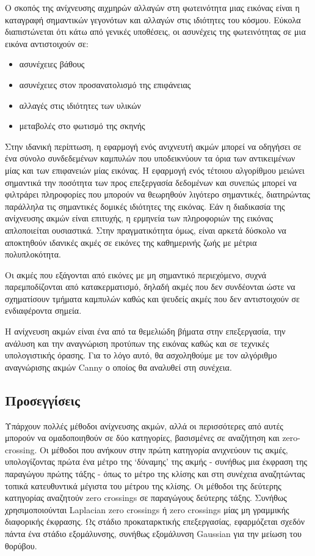 Ο σκοπός της ανίχνευσης αιχμηρών αλλαγών στη φωτεινότητα μιας εικόνας είναι η καταγραφή σημαντικών γεγονότων και αλλαγών στις ιδιότητες του κόσμου. Εύκολα διαπιστώνεται ότι κάτω από γενικές υποθέσεις, οι ασυνέχεις της φωτεινότητας σε μια εικόνα αντιστοιχούν σε:
\begin{itemize}
	\item ασυνέχειες βάθους
	\item ασυνέχειες στον προσανατολισμό της επιφάνειας
	\item αλλαγές στις ιδιότητες των υλικών
	\item μεταβολές στο φωτισμό της σκηνής \\
\end{itemize}
Στην ιδανική περίπτωση, η εφαρμογή ενός ανιχνευτή ακμών μπορεί να οδηγήσει σε ένα σύνολο συνδεδεμένων καμπυλών που υποδεικνύουν τα όρια των αντικειμένων μίας και των επιφανειών μίας εικόνας. Η εφαρμογή ενός τέτοιου αλγορίθμου μειώνει σημαντικά την ποσότητα των προς επεξεργασία δεδομένων και συνεπώς μπορεί να φιλτράρει πληροφορίες που μπορούν να θεωρηθούν λιγότερο σημαντικές, διατηρώντας παράλληλα τις σημαντικές δομικές ιδιότητες της εικόνας. Εάν η διαδικασία της ανίχνευσης ακμών είναι επιτυχής, η ερμηνεία των πληροφοριών της εικόνας απλοποιείται ουσιαστικά. Στην πραγματικότητα όμως, είναι αρκετά δύσκολο να αποκτηθούν ιδανικές ακμές σε εικόνες της καθημερινής ζωής με μέτρια πολυπλοκότητα.

Οι ακμές που εξάγονται από εικόνες με μη σημαντικό περιεχόμενο, συχνά παρεμποδίζονται από κατακερματισμό, δηλαδή ακμές που δεν συνδέονται ώστε να σχηματίσουν τμήματα καμπυλών καθώς και ψευδείς ακμές που δεν αντιστοιχούν σε ενδιαφέροντα σημεία.

Η ανίχνευση ακμών είναι ένα από τα θεμελιώδη βήματα στην επεξεργασία, την ανάλυση και την αναγνώριση προτύπων της εικόνας καθώς και σε τεχνικές υπολογιστικής όρασης. Για το λόγο αυτό, θα ασχοληθούμε με τον αλγόριθμο αναγνώρισης ακμών Canny ο οποίος θα αναλυθεί στη συνέχεια.

\subsection{Προσεγγίσεις}

Υπάρχουν πολλές μέθοδοι ανίχνευσης ακμών, αλλά οι περισσότερες από αυτές μπορούν να ομαδοποιηθούν σε δύο κατηγορίες, βασισμένες σε αναζήτηση και zero-crossing. Οι μέθοδοι που ανήκουν στην πρώτη κατηγορία ανιχνεύουν τις ακμές, υπολογίζοντας πρώτα ένα μέτρο της `δύναμης' της ακμής - συνήθως μια έκφραση της παραγώγου πρώτης τάξης - όπως το μέτρο της κλίσης και στη συνέχεια αναζητώντας τοπικά κατευθυντικά μέγιστα του μέτρου της κλίσης. Οι μέθοδοι της δεύτερης κατηγορίας αναζητούν zero crossings σε παραγώγους δεύτερης τάξης. Συνήθως χρησιμοποιούνται Laplacian zero crossings ή zero crossings μίας μη γραμμικής διαφορικής έκφρασης. Ως στάδιο προκαταρκτικής επεξεργασίας, εφαρμόζεται σχεδόν πάντα ένα στάδιο εξομάλυνσης, συνήθως εξομάλυνση Gaussian για την μείωση του θορύβου.


